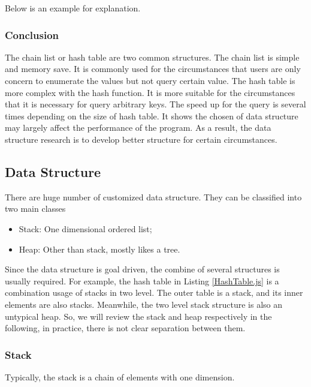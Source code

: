 Below is an example for explanation.



\subsubsection{Conclusion}

The chain list or hash table are two common structures.
The chain list is simple and memory save.
It is commonly used for the circumstances that users are only concern to enumerate the values but not query certain value.
The hash table is more complex with the hash function.
It is more suitable for the circumstances that it is necessary for query arbitrary keys.
The speed up for the query is several times depending on the size of hash table.
It shows the chosen of data structure may largely affect the performance of the program.
As a result, the data structure research is to develop better structure for certain circumstances.

\subsection{Data Structure}

There are huge number of customized data structure.
They can be classified into two main classes
\begin{itemize}
    \item Stack: One dimensional ordered list;
    \item Heap: Other than stack, mostly likes a tree.
\end{itemize}
Since the data structure is goal driven, the combine of several structures is usually required.
For example, the hash table in Listing \ref{HashTable.js} is a combination usage of stacks in two level.
The outer table is a stack, and its inner elements are also stacks.
Meanwhile, the two level stack structure is also an untypical heap.
So, we will review the stack and heap respectively in the following,
in practice, there is not clear separation between them.

\subsubsection{Stack}

Typically, the stack is a chain of elements with one dimension.

